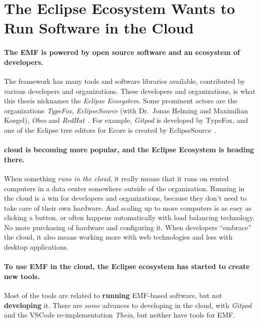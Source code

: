 \section{The Eclipse Ecosystem Wants to Run Software in the Cloud}

\paragraph{The \acrlong{EMF} is powered by \gls{open source} software and an ecosystem of developers.}
The framework has many tools and software libraries available, contributed by various developers and organizations.
These developers and organizations, is what this thesis nicknames the \textit{Eclipse Ecosystem}.
Some prominent actors are the organizations \textit{TypeFox}, \textit{EclipseSource} (with Dr.\ Jonas Helming and Maximilian Koegel), \textit{Obeo} and \textit{RedHat}~\cite{rekstadModelingEnvironmentCloud2020}.
For example, \textit{\gls{Gitpod}} is developed by TypeFox, and one of the \gls{Eclipse} tree editors for \gls{Ecore} is created by EclipseSource~\cite{typefoxTypeFoxSmartTools,eclipsesourceEMFFormsEditors2016}.

\paragraph{\Gls{cloud} is becoming more popular, and the Eclipse Ecosystem is heading there.}
When something \textit{runs in the \gls{cloud}}, it really means that it runs on rented computers in a data center somewhere outside of the organization.
Running in the cloud is a win for developers and organizations, because they don't need to take care of their own hardware.
And scaling up to more computers is as easy as clicking a button, or often happens automatically with load balancing technology.
No more purchasing of hardware and configuring it.
When developers ``embrace'' the \gls{cloud}, it also means working more with web technologies and less with desktop applications.

\paragraph{To use \acrshort{EMF} in the cloud, the Eclipse ecosystem has started to create new tools.}
Most of the tools are related to \textbf{running} \acrshort{EMF}-based software, but not \textbf{developing} it.
There are \textit{some} advances to developing in the cloud, with \textit{Gitpod} and the \gls{VSCode} re-implementation \textit{\gls{Theia}}, but neither have tools for \acrshort{EMF}.



